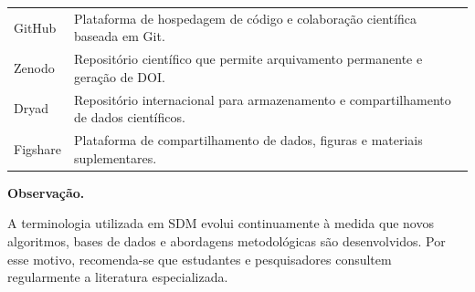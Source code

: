 \begin{longtable}{
		p{}
		p{}
	}
	GitHub &
	Plataforma de hospedagem de código e colaboração científica baseada em Git.
	\\
	
	Zenodo &
	Repositório científico que permite arquivamento permanente e geração de DOI.
	\\
	
	Dryad &
	Repositório internacional para armazenamento e compartilhamento de dados científicos.
	\\
	
	Figshare &
	Plataforma de compartilhamento de dados, figuras e materiais suplementares.
	\\
	
	\bottomrule
	
\end{longtable}

\begin{conceito}
	\textbf{Observação.}
	
	A terminologia utilizada em SDM evolui continuamente à medida que novos
	algoritmos, bases de dados e abordagens metodológicas são desenvolvidos.
	Por esse motivo, recomenda-se que estudantes e pesquisadores consultem
	regularmente a literatura especializada.
\end{conceito}

